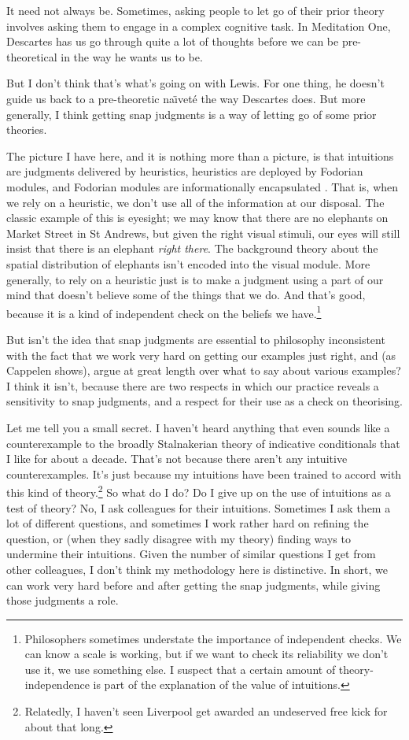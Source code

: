 It need not always be. Sometimes, asking people to let go of their prior theory involves asking them to engage in a complex cognitive task. In Meditation One, Descartes has us go through quite a lot of thoughts before we can be pre-theoretical in the way he wants us to be.

But I don't think that's what's going on with Lewis. For one thing, he doesn't guide us back to a pre-theoretic na\"{\i}vet\'e the way Descartes does. But more generally, I think getting snap judgments is a way of letting go of some prior theories.

The picture I have here, and it is nothing more than a picture, is that intuitions are judgments delivered by heuristics, heuristics are deployed by Fodorian modules, and Fodorian modules are informationally encapsulated \citep{Fodor1983, Fodor2000}. That is, when we rely on a heuristic, we don't use all of the information at our disposal. The classic example of this is eyesight; we may know that there are no elephants on Market Street in St Andrews, but given the right visual stimuli, our eyes will still insist that there is an elephant \textit{right there}. The background theory about the spatial distribution of elephants isn't encoded into the visual module. More generally, to rely on a heuristic just is to make a judgment using a part of our mind that doesn't believe some of the things that we do. And that's good, because it is a kind of independent check on the beliefs we have.\footnote{Philosophers sometimes understate the importance of independent checks. We can know a scale is working, but if we want to check its reliability we don't use it, we use something else. I suspect that a certain amount of theory-independence is part of the explanation of the value of intuitions.}

But isn't the idea that snap judgments are essential to philosophy inconsistent with the fact that we work very hard on getting our examples just right, and (as Cappelen shows), argue at great length over what to say about various examples? I think it isn't, because there are two respects in which our practice reveals a sensitivity to snap judgments, and a respect for their use as a check on theorising.

Let me tell you a small secret. I haven't heard anything that even sounds like a counterexample to the broadly Stalnakerian theory of indicative conditionals that I like for about a decade. That's not because there aren't any intuitive counterexamples. It's just because my intuitions have been trained to accord with this kind of theory.\footnote{Relatedly, I haven't seen Liverpool get awarded an undeserved free kick for about that long.} So what do I do? Do I give up on the use of intuitions as a test of theory? No, I ask colleagues for their intuitions. Sometimes I ask them a lot of different questions, and sometimes I work rather hard on refining the question, or (when they sadly disagree with my theory) finding ways to undermine their intuitions. Given the number of similar questions I get from other colleagues, I don't think my methodology here is distinctive. In short, we can work very hard before and after getting the snap judgments, while giving those judgments a role.

